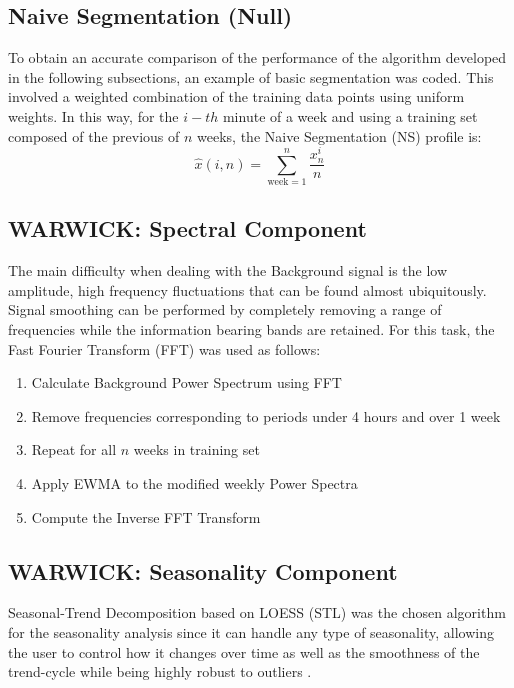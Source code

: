 \documentclass[letterpaper, 10 pt, conference]{ieeeconf}  %
\begin{document}
\subsection{Naive Segmentation (Null)}
To obtain an accurate comparison of the performance of the algorithm developed in the following subsections, an example of basic segmentation was coded. 
This involved a weighted combination of the training data points using uniform weights. 
In this way, for the $i-th$ minute of a week and using a training set composed of the previous of $n$ weeks, the Naive Segmentation (NS) profile is:
\begin{equation}
\hat{x}(i,n) = \sum_{\textrm{week}=1}^{n} \frac{x^i_n}{n} 
\end{equation}

\subsection{WARWICK: Spectral Component}
The main difficulty when dealing with the Background signal is the low amplitude, high frequency fluctuations that can be found almost ubiquitously. 
Signal smoothing can be performed by completely removing a range of frequencies while the information bearing bands are retained. For this task, the Fast Fourier Transform (FFT) \cite{FFT} was used as follows:
\begin{enumerate}

	\item Calculate Background Power Spectrum using FFT
	\item Remove frequencies corresponding to periods under 4 hours and over 1 week
	\item Repeat for all $n$ weeks in training set
    \item Apply EWMA to the modified weekly Power Spectra
	\item Compute the Inverse FFT Transform

\end{enumerate}
\subsection{WARWICK: Seasonality Component}
Seasonal-Trend Decomposition based on LOESS (STL) \cite{STL} was the chosen algorithm for the seasonality analysis since it can handle any type of seasonality, allowing the user to control how it changes over time as well as the smoothness of the trend-cycle while being highly robust to outliers \cite{forecasting}.\\
\end{document}
